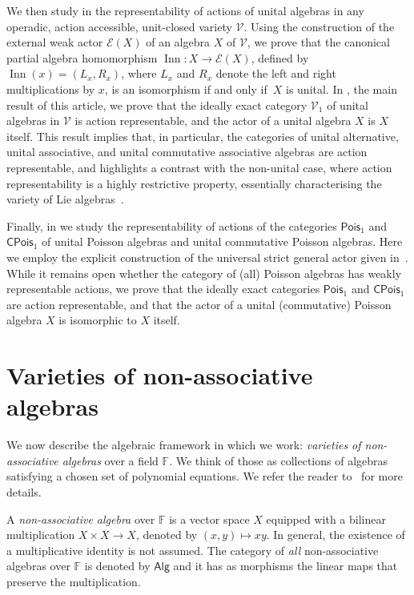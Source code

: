 \documentclass[reqno,a4paper]{amsart}
\theoremstyle{plain}
\theoremstyle{definition}
\theoremstyle{remark}
\numberwithin{equation}{section}
\newcommand{\F}{\mathbb{F}}
\newcommand{\E}{\mathcal{E}}
\newcommand{\V}{\mathcal{V}}
\DeclareMathOperator{\Inn}{Inn}
\newcommand{\Pois}{\ensuremath{\mathsf{Pois}}}
\newcommand{\CPois}{\ensuremath{\mathsf{CPois}}}
\newcommand{\Alg}{\ensuremath{\mathsf{Alg}}}
\begin{document}
We then study in  the representability of actions of unital algebras in any operadic, action accessible, unit-closed variety $\V$. Using the construction of the external weak actor $\E(X)$ of an algebra $X$ of $\V$, we prove that the canonical partial algebra homomorphism $\Inn \colon X \to \E(X)$, defined by $\Inn(x) = (L_x,R_x)$, where $L_x$ and $R_x$ denote the left and right multiplications by $x$, is an isomorphism if and only if~$X$ is unital. In , the main result of this article, we prove that the ideally exact category $\V_1$ of unital algebras in $\V$ is action representable, and the actor of a unital algebra $X$ is $X$ itself. This result implies that, in particular, the categories of unital alternative, unital associative, and unital commutative associative algebras are action representable, and highlights a contrast with the non-unital case, where action representability is a highly restrictive property, essentially characterising the variety of Lie algebras~\cite{Tim}.

Finally, in  we study the representability of actions of the categories $\Pois_1$ and $\CPois_1$ of unital Poisson algebras and unital commutative Poisson algebras. Here we employ the explicit construction of the universal strict general actor given in~\cite{CigoliManciniMetere}. While it remains open whether the category of (all) Poisson algebras has weakly representable actions, we prove that the ideally exact categories $\Pois_1$ and $\CPois_1$ are action representable, and that the actor of a unital (commutative) Poisson algebra $X$ is isomorphic to $X$ itself.

\section{Varieties of non-associative algebras}\label{SecVar}

We now describe the algebraic framework in which we work: \emph{varieties of non-associative algebras} over a field $\F$. We think of those as collections of algebras satisfying a chosen set of polynomial equations. We refer the reader to~\cite{VdL-NAA} for more details.

A \emph{non-associative algebra} over $\F$ is a vector space $X$ equipped with a bilinear multiplication $X \times X \to  X$, denoted by $(x,y) \mapsto xy$. In general, the existence of a multiplicative identity is not assumed. The category of \emph{all} non-associative algebras over $\F$ is denoted by $\Alg$ and it has as morphisms the linear maps that preserve the multiplication.
\end{document}

